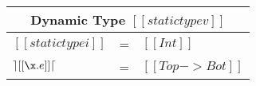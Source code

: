 \documentclass[a4paper]{article}
\begin{document}
\bigskip

\ottdefnsOrdinary

\ottdefnsSubtyping

\ottdefnsTyping

\ottdefnsReduction

  \begin{center}
  {\renewcommand{\arraystretch}{1.2}
    \begin{tabular}{|lcl|}
      \multicolumn{3}{c}{Dynamic Type $[[statictype v]]$} \\
      \hline
      $[[statictype i]]$ & = & $[[Int]]$ \\
      $\rceil [[\x.e]] \lceil$ & = & $[[Top -> Bot]]$ \\
      \hline
    \end{tabular} }
  \end{center}
\end{document}
